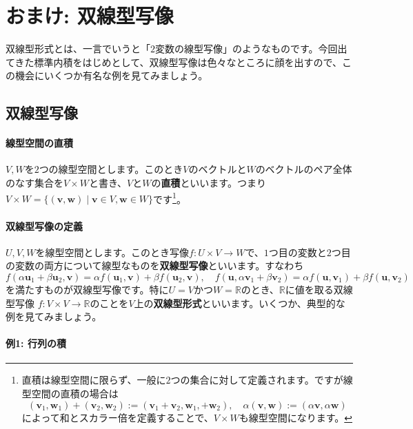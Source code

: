 \section{おまけ: 双線型写像}

双線型形式とは、一言でいうと「$2$変数の線型写像」のようなものです。今回出てきた標準内積をはじめとして、双線型写像は色々なところに顔を出すので、この機会にいくつか有名な例を見てみましょう。

\subsection{双線型写像}

\paragraph{線型空間の直積} $V, W$を$2$つの線型空間とします。このとき$V$のベクトルと$W$のベクトルのペア全体のなす集合を$V \times W$と書き、$V$と$W$の\textbf{直積}といいます。つまり$V\times W = \{(\bm{v}, \bm{w})\mid \bm{v} \in V, \bm{w} \in W\}$です\footnote{直積は線型空間に限らず、一般に$2$つの集合に対して定義されます。ですが線型空間の直積の場合は
\[
(\bm{v}_1, \bm{w}_1) + (\bm{v}_2, \bm{w}_2) := (\bm{v}_1 + \bm{v}_2, \bm{w}_1, + \bm{w}_2), \quad
\alpha(\bm{v}, \bm{w}) := (\alpha\bm{v}, \alpha\bm{w})
\]
によって和とスカラー倍を定義することで、$V\times W$も線型空間になります。}。

\paragraph{双線型写像の定義}

$U, V, W$を線型空間とします。このとき写像$f\colon U\times V \rightarrow W$で、$1$つ目の変数と$2$つ目の変数の両方について線型なものを\textbf{双線型写像}といいます。すなわち
\[
f(\alpha \bm{u}_1 + \beta \bm{u}_2, \bm{v}) = \alpha f(\bm{u}_1, \bm{v}) + \beta f(\bm{u}_2, \bm{v}), \quad
f(\bm{u}, \alpha \bm{v}_1 + \beta \bm{v}_2) = \alpha f(\bm{u}, \bm{v}_1) + \beta f(\bm{u}, \bm{v}_2)
\]
を満たすものが双線型写像です。特に$U = V$かつ$W = \mathbb{R}$のとき、$\mathbb{R}$に値を取る双線型写像 $f\colon V\times V \rightarrow \mathbb{R}$のことを$V$上の\textbf{双線型形式}といいます。いくつか、典型的な例を見てみましょう。

\paragraph{例1: 行列の積} 

